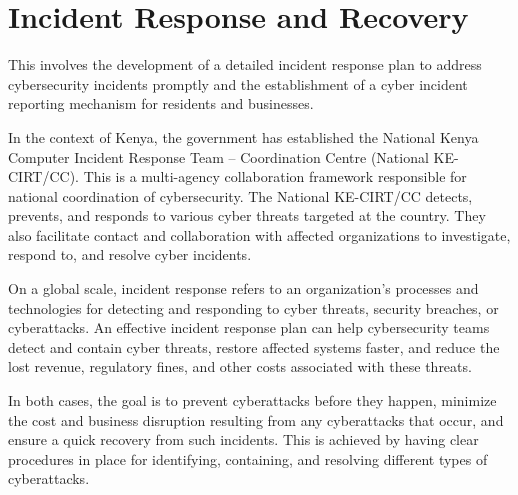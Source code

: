 \documentclass{article}
\begin{document}
\section{Incident Response and Recovery}

This involves the development of a detailed incident response plan to address cybersecurity incidents promptly and the establishment of a cyber incident reporting mechanism for residents and businesses.


In the context of Kenya, the government has established the National Kenya Computer Incident Response Team – Coordination Centre (National KE-CIRT/CC). This is a multi-agency collaboration framework responsible for national coordination of cybersecurity\cite{communications-authority-of-kenya-incidents-no-date}. The National KE-CIRT/CC detects, prevents, and responds to various cyber threats targeted at the country\cite{communications-authority-of-kenya-incidents-no-date}. They also facilitate contact and collaboration with affected organizations to investigate, respond to, and resolve cyber incidents\cite{communications-authority-of-kenya-incidents-no-date}.


On a global scale, incident response refers to an organization’s processes and technologies for detecting and responding to cyber threats, security breaches, or cyberattacks\cite{ibm-incidents-response-no-date}. An effective incident response plan can help cybersecurity teams detect and contain cyber threats, restore affected systems faster, and reduce the lost revenue, regulatory fines, and other costs associated with these threats\cite{ibm-incidents-response-no-date}.


In both cases, the goal is to prevent cyberattacks before they happen, minimize the cost and business disruption resulting from any cyberattacks that occur, and ensure a quick recovery from such incidents. This is achieved by having clear procedures in place for identifying, containing, and resolving different types of cyberattacks\cite{ibm-incidents-response-no-date}.
\end{document}
